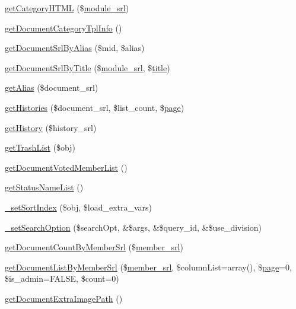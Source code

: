 \begin{DoxyCompactItemize}
\item 
\hyperlink{classdocumentModel_aaef2e7fbbf9029fbee0aaa6e0d97f97f}{get\-Category\-H\-T\-M\-L} (\$\hyperlink{ko_8install_8php_a370bb6450fab1da3e0ed9f484a38b761}{module\-\_\-srl})
\item 
\hyperlink{classdocumentModel_a237a07a80ec3e7e8825207dec22d3f3d}{get\-Document\-Category\-Tpl\-Info} ()
\item 
\hyperlink{classdocumentModel_a48ea5734f5dc53ab463d5b59a6b98dab}{get\-Document\-Srl\-By\-Alias} (\$mid, \$alias)
\item 
\hyperlink{classdocumentModel_ae743013207d178a0115a3116f8576786}{get\-Document\-Srl\-By\-Title} (\$\hyperlink{ko_8install_8php_a370bb6450fab1da3e0ed9f484a38b761}{module\-\_\-srl}, \$\hyperlink{ko_8install_8php_a5b072c5fd1d2228c6ba5cee13cd142e3}{title})
\item 
\hyperlink{classdocumentModel_a432924d21a54089bb55cae2f3dc9dfd1}{get\-Alias} (\$document\-\_\-srl)
\item 
\hyperlink{classdocumentModel_a7f66805da3386473c2e530f767301ff8}{get\-Histories} (\$document\-\_\-srl, \$list\-\_\-count, \$\hyperlink{classpage}{page})
\item 
\hyperlink{classdocumentModel_ac21b570d350dc1e0f6f990750b673f72}{get\-History} (\$history\-\_\-srl)
\item 
\hyperlink{classdocumentModel_a428c7beb4eb06031f1412a58c017ea20}{get\-Trash\-List} (\$obj)
\item 
\hyperlink{classdocumentModel_ab0f8e68c8df234d70ce66bd286df3015}{get\-Document\-Voted\-Member\-List} ()
\item 
\hyperlink{classdocumentModel_a47541348b4212971ce508fb2a24ce4f3}{get\-Status\-Name\-List} ()
\item 
\hyperlink{classdocumentModel_a5e4a2c7a303637e89ace7882a9a0d77c}{\-\_\-set\-Sort\-Index} (\$obj, \$load\-\_\-extra\-\_\-vars)
\item 
\hyperlink{classdocumentModel_aba67b239466934c3eff8b4b4f5adc8a5}{\-\_\-set\-Search\-Option} (\$search\-Opt, \&\$args, \&\$query\-\_\-id, \&\$use\-\_\-division)
\item 
\hyperlink{classdocumentModel_aef8741dec5f19c45c98d9d749974c82b}{get\-Document\-Count\-By\-Member\-Srl} (\$\hyperlink{ko_8install_8php_aa61f9e08f0fe505094d26f8143f30bbd}{member\-\_\-srl})
\item 
\hyperlink{classdocumentModel_a27d9af35978748d347769b3bb0ca03c0}{get\-Document\-List\-By\-Member\-Srl} (\$\hyperlink{ko_8install_8php_aa61f9e08f0fe505094d26f8143f30bbd}{member\-\_\-srl}, \$column\-List=array(), \$\hyperlink{classpage}{page}=0, \$is\-\_\-admin=F\-A\-L\-S\-E, \$count=0)
\item 
\hyperlink{classdocumentModel_a2a368f9573cf623049a40cc99b7f0f6b}{get\-Document\-Extra\-Image\-Path} ()
\end{DoxyCompactItemize}
